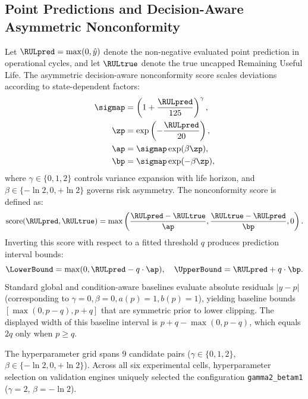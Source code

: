 
\subsection*{Point Predictions and Decision-Aware Asymmetric Nonconformity}
Let $\RULpred = \max(0, \hat{y})$ denote the non-negative evaluated point prediction in operational cycles, and let $\RULtrue$ denote the true uncapped Remaining Useful Life. The asymmetric decision-aware nonconformity score scales deviations according to state-dependent factors:
\begin{align}
\sigmap &= \left(1 + \frac{\RULpred}{125}\right)^\gamma, \\
\zp &= \exp\left(-\frac{\RULpred}{20}\right), \\
\ap &= \sigmap \exp(\beta \zp), \\
\bp &= \sigmap \exp(-\beta \zp),
\end{align}
where $\gamma \in \{0, 1, 2\}$ controls variance expansion with life horizon, and $\beta \in \{-\ln 2, 0, +\ln 2\}$ governs risk asymmetry. The nonconformity score is defined as:
\begin{equation}
\text{score}(\RULpred, \RULtrue) = \max\left(\frac{\RULpred - \RULtrue}{\ap}, \frac{\RULtrue - \RULpred}{\bp}, 0\right).
\end{equation}
Inverting this score with respect to a fitted threshold $q$ produces prediction interval bounds:
\begin{equation}
\LowerBound = \max(0, \RULpred - q \cdot \ap), \quad \UpperBound = \RULpred + q \cdot \bp.
\end{equation}
Standard global and condition-aware baselines evaluate absolute residuals $|y - p|$ (corresponding to $\gamma=0, \beta=0, a(p)=1, b(p)=1$), yielding baseline bounds $[ \max(0, p - q), p + q ]$ that are symmetric prior to lower clipping. The displayed width of this baseline interval is $p + q - \max(0, p - q)$, which equals $2q$ only when $p \ge q$.

The hyperparameter grid spans 9 candidate pairs ($\gamma \in \{0, 1, 2\}$, $\beta \in \{-\ln 2, 0, +\ln 2\}$). Across all six experimental cells, hyperparameter selection on validation engines uniquely selected the configuration \texttt{gamma2\_betam1} ($\gamma = 2$, $\beta = -\ln 2$).


